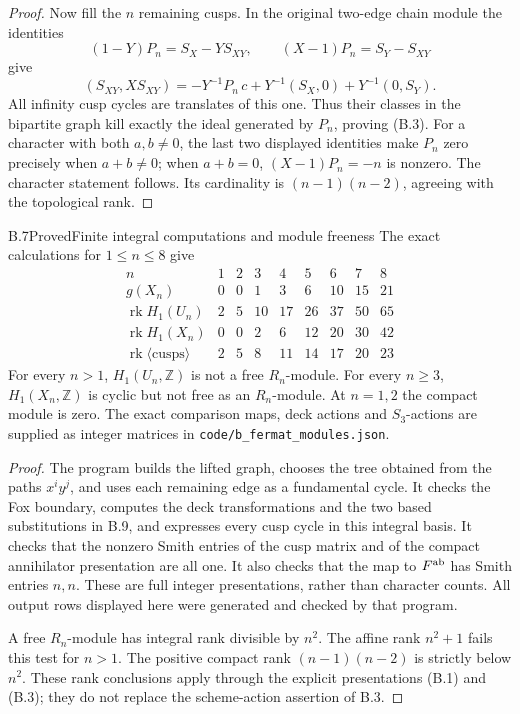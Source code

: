 \begin{proof}
Now fill the \(n\) remaining cusps. In the original two-edge chain
module the identities
\[
 (1-Y)P_n=S_X-Y S_{XY},\qquad
 (X-1)P_n=S_Y-S_{XY}
\]
give
\[
 (S_{XY},X S_{XY})
 =-Y^{-1}P_n\,c+Y^{-1}(S_X,0)+Y^{-1}(0,S_Y).
\]
All infinity cusp cycles are translates of this one. Thus their
classes in the bipartite graph kill exactly the ideal generated by
\(P_n\), proving (B.3).
For a character with both \(a,b\ne0\), the last two displayed identities
make \(P_n\) zero precisely when \(a+b\ne0\); when \(a+b=0\),
\((X-1)P_n=-n\) is nonzero. The character statement follows. Its
cardinality is \((n-1)(n-2)\), agreeing with the topological rank.
\end{proof}

\begin{statement}{B.7}{Proved}{Finite integral computations and module freeness}
The exact calculations for \(1\le n\le8\) give
\[
\begin{array}{c|rrrrrrrr}
n&1&2&3&4&5&6&7&8\\ \hline
g(X_n)&0&0&1&3&6&10&15&21\\
\operatorname{rk}H_1(U_n)&2&5&10&17&26&37&50&65\\
\operatorname{rk}H_1(X_n)&0&0&2&6&12&20&30&42\\
\operatorname{rk}\langle\text{cusps}\rangle&2&5&8&11&14&17&20&23
\end{array}
\]
For every \(n>1\), \(H_1(U_n,\mathbb Z)\) is not a free \(R_n\)-module.
For every \(n\ge3\), \(H_1(X_n,\mathbb Z)\) is cyclic but not free
as an \(R_n\)-module. At \(n=1,2\) the compact module is zero.
The exact comparison maps, deck actions and \(S_3\)-actions are supplied
as integer matrices in \texttt{code/b\_fermat\_modules.json}.
\end{statement}
\begin{proof}
The program builds the lifted graph, chooses the tree obtained from the
paths \(x^i y^j\), and uses each remaining edge as a fundamental cycle.
It checks the Fox boundary, computes the deck transformations and the
two based substitutions in B.9, and expresses every cusp cycle in
this integral basis. It checks that the nonzero Smith entries of the
cusp matrix and of the compact annihilator presentation are all one.
It also checks that the map to \(F^{\rm ab}\) has Smith entries \(n,n\).
These are full integer presentations, rather than character counts.
All output rows displayed here were generated and checked by that program.

A free \(R_n\)-module has integral rank divisible by \(n^2\).
The affine rank \(n^2+1\) fails this test for \(n>1\).
The positive compact rank \((n-1)(n-2)\) is strictly below \(n^2\).
These rank conclusions apply through the explicit presentations
(B.1) and (B.3); they do not replace the scheme-action assertion of B.3.
\end{proof}

